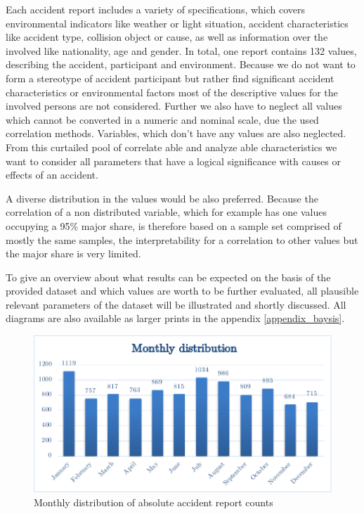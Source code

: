 \documentclass[a4paper,12pt]{report}
\begin{document}
Each accident report includes a variety of specifications, which covers environmental indicators like weather or light situation, accident characteristics like accident type, collision object or cause, as well as information over the involved like nationality, age and gender. In total, one report contains 132 values, describing the accident, participant and environment. Because we do not want to form a stereotype of accident participant but rather find significant accident characteristics or environmental factors most of the descriptive values for the involved persons are not considered. Further we also have to neglect all values which cannot be converted in a numeric and nominal scale, due the used correlation methods. Variables, which don’t have any values are also neglected. From this curtailed pool of correlate able and analyze able characteristics we want to consider all parameters that have a logical significance with causes or effects of an accident. \newline

A diverse distribution in the values would be also preferred. Because the correlation of a non distributed variable, which for example has one values occupying a 95\% major share, is therefore based on a sample set comprised of mostly the same samples, the interpretability for a correlation to other values but the major share is very limited.
\newline
\par To give an overview about what results can be expected on the basis of the provided dataset and which values are worth to be further evaluated, all plausible relevant parameters of the dataset will be illustrated and shortly discussed. All diagrams are also available as larger prints in the appendix \ref{appendix_baysis}. 

\begin{figure}[h]
	\centering
	\includegraphics[scale=0.6]{./assets/baysis_dataset_monthly_absolute.pdf}
	\caption{Monthly distribution of absolute accident report counts}
	\label{img:baysis_monthlyDist_absolute}
\end{figure}
\end{document}
